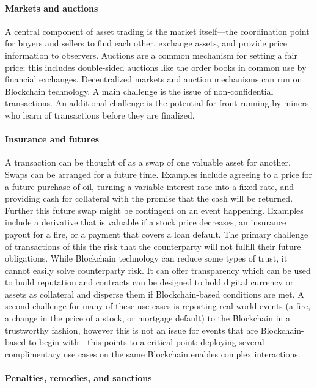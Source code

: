 \paragraph{Markets and auctions}

A central component of asset trading is the market itself---the coordination point for buyers and sellers to find each other, exchange assets, and provide price information to observers.
Auctions are a common mechanism for setting a fair price; this includes double-sided auctions like the order books in common use by financial exchanges. 
Decentralized markets and auction mechanisms can run on Blockchain technology.
A main challenge is the issue of non-confidential transactions. 
An additional challenge is the potential for front-running by miners who learn of transactions before they are finalized. 

\paragraph{Insurance and futures}

A transaction can be thought of as a swap of one valuable asset for another. Swaps can be arranged for a future time.
Examples include agreeing to a price for a future purchase of oil, turning a variable interest rate into a fixed rate, and providing cash for collateral with the promise that the cash will be returned.
Further this future swap might be contingent on an event happening. 
Examples include a derivative that is valuable if a stock price decreases, an insurance payout for a fire, or a payment that covers a loan default.
The primary challenge of transactions of this the risk that the counterparty will not fulfill their future obligations. While Blockchain technology can reduce some types of trust, it cannot easily solve counterparty risk. 
It can offer transparency which can be used to build reputation and contracts can be designed to hold digital currency or assets as collateral and disperse them if Blockchain-based conditions are met.
A second challenge for many of these use cases is reporting real world events (a fire, a change in the price of a stock, or mortgage default) to the Blockchain in a trustworthy fashion, however this is not an issue for events that are Blockchain-based to begin with---this points to a critical point: deploying several complimentary use cases on the same Blockchain enables complex interactions. 

\paragraph{Penalties, remedies, and sanctions}


